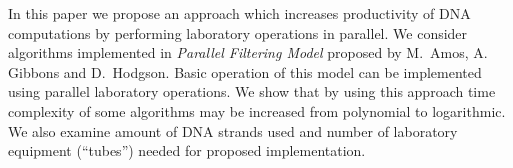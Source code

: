 In this paper we propose an approach which increases productivity of DNA computations  by performing laboratory operations in parallel. We consider algorithms implemented in \emph{Parallel Filtering Model} proposed by M.~Amos, A.~ Gibbons and D.~Hodgson. Basic operation of this model can be implemented using parallel laboratory operations. We show that by using this approach time complexity of some algorithms may be increased from polynomial to logarithmic. We also examine amount of DNA strands used and number of laboratory equipment (``tubes'') needed for proposed implementation.